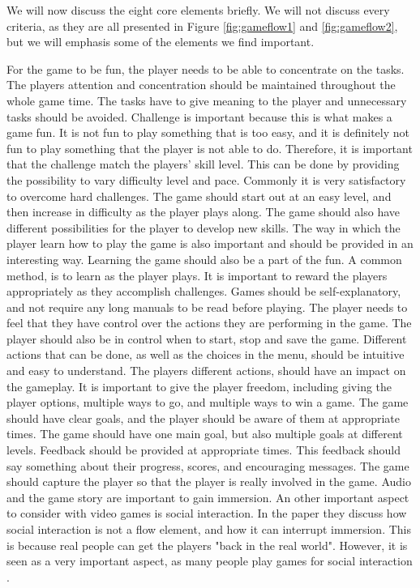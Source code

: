 We will now discuss the eight core elements briefly. We will not discuss every criteria, as they are all presented in Figure \ref{fig:gameflow1} and \ref{fig:gameflow2}, but we will emphasis some of the elements we find important. 

For the game to be fun, the player needs to be able to concentrate on the tasks. The players attention and concentration should be maintained throughout the whole game time. The tasks have to give meaning to the player and unnecessary tasks should be avoided. Challenge is important because this is what makes a game fun. It is not fun to play something that is too easy, and it is definitely not fun to play something that the player is not able to do. Therefore, it is important that the challenge match the players' skill level. This can be done by providing the possibility to vary difficulty level and pace. Commonly it is very satisfactory to overcome hard challenges. The game should start out at an easy level, and then increase in difficulty as the player plays along. The game should also have different possibilities for the player to develop new skills. The way in which the player learn how to play the game is also important and should be provided in an interesting way. Learning the game should also be a part of the fun. A common method, is to learn as the player plays. It is important to reward the players appropriately as they accomplish challenges.  Games should be self-explanatory, and not require any long manuals to be read before playing. The player needs to feel that they have control over the actions they are performing in the game. The player should also be in control when to start, stop and save the game. Different actions that can be done, as well as the choices in the menu, should be intuitive and easy to understand. The players different actions, should have an impact on the gameplay. It is important to give the player freedom, including giving the player options, multiple ways to go, and multiple ways to win a game. The game should have clear goals, and the player should be aware of them at appropriate times. The game should have one main goal, but also multiple goals at different levels. Feedback should be provided at appropriate times. This feedback should say something about their progress, scores, and encouraging messages. The game should capture the player so that the player is really involved in the game. Audio and the game story are important to gain immersion. An other important aspect to consider with video games is social interaction. In the paper they discuss how social interaction is not a flow element, and how it can interrupt immersion. This is because real people can get the players "back in the real world". However, it is seen as a very important aspect, as many people play games for social interaction \cite{sweetser}.

